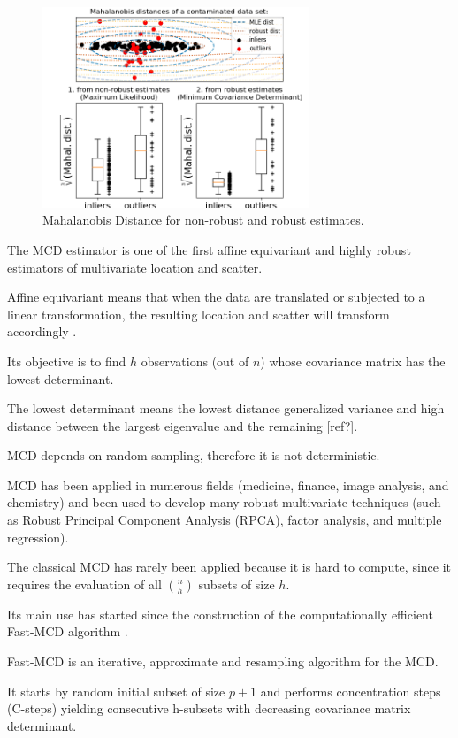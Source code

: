 \documentclass[review]{elsarticle}
\begin{document}
\begin{figure}[h!]
     \centering
     \includegraphics[width=8cm]{figures/mahalanobis_distances01.png}
     \caption{Mahalanobis Distance for non-robust and robust estimates.}
     \label{fig:fig05}
\end{figure}

The MCD estimator is one of the first affine equivariant and highly robust estimators of multivariate location and scatter.
		
Affine equivariant means that when the data are translated or subjected to a linear transformation, the resulting location and scatter will transform accordingly \cite{rousseeuw1984mcd,rousseeuw1999fastmcd}.

Its objective is to find $h$ observations (out of $n$) whose covariance matrix has the lowest determinant.

The lowest determinant means the lowest distance generalized variance and high distance between the largest eigenvalue and the remaining [ref?].

MCD depends on random sampling, therefore it is not deterministic.

MCD has been applied in numerous fields (medicine, finance, image analysis, and chemistry) and been used to develop many robust multivariate techniques (such as Robust Principal Component Analysis (RPCA), factor analysis, and multiple regression).

The classical MCD has rarely been applied because it is hard to compute, since it requires the evaluation of all $\binom{n}{h}$ subsets of size $h$. %

Its main use has started since the construction of the computationally efficient Fast-MCD algorithm \cite{rousseeuw1999fastmcd}.

Fast-MCD is an iterative, approximate and resampling algorithm for the MCD.

It starts by random initial subset of size $p+1$ and performs concentration steps (C-steps) yielding consecutive h-subsets with decreasing covariance matrix determinant.
\end{document}
